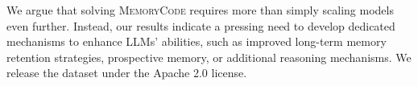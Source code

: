 We argue that solving \textsc{MemoryCode} requires more than simply scaling models even further. 
Instead, our results indicate a pressing need to develop dedicated mechanisms to enhance LLMs' abilities, such as improved long-term memory retention strategies, prospective memory, or additional reasoning mechanisms. We release the dataset under the Apache 2.0 license. 









